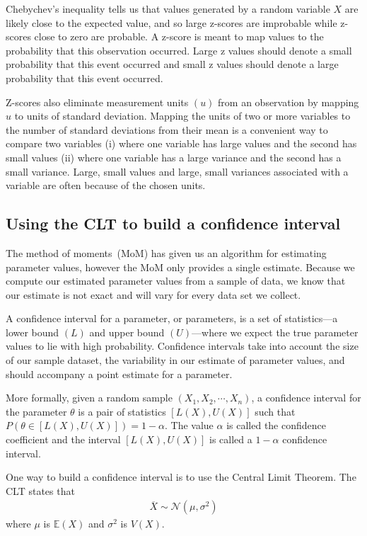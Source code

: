 Chebychev's inequality tells us that values generated by a random variable $X$ are likely close to the expected value, and so large z-scores are improbable while z-scores close to zero are probable.
A z-score is meant to map values to the probability that this observation occurred. Large z values should denote a small probability that this event occurred and small z values should denote a large probability that this event occurred.

Z-scores also eliminate measurement units $(u)$ from an observation by mapping $u$ to units of standard deviation. 
Mapping the units of two or more variables to the number of standard deviations from their mean is a convenient way to compare two variables (i) where one variable has large values and the second has small values (ii) where one variable has a large variance and the second has a small variance. 
Large, small values and large, small variances associated with a variable are often because of the chosen units. 

\subsection{Using the CLT to build a confidence interval}

The method of moments~(MoM) has given us an algorithm for estimating parameter values, however the MoM only provides a single estimate. 
Because we compute our estimated parameter values from a sample of data, we know that our estimate is not exact and will vary for every data set we collect.

A confidence interval for a parameter, or parameters, is a set of statistics---a lower bound $(L)$ and upper bound $(U)$---where we expect the true parameter values to lie with high probability. 
Confidence intervals take into account the size of our sample dataset, the variability in our estimate of parameter values, and should accompany a point estimate for a parameter.

\ex

More formally, given a random sample $(X_{1},X_{2},\cdots,X_{n})$,  a confidence interval for the parameter $\theta$ is a pair of statistics $[L(X), U(X)]$ such that $P(\theta \in [L(X),U(X)]) = 1-\alpha$. 
The value $\alpha$ is called the confidence coefficient and the interval $[L(X), U(X)]$ is called a $1-\alpha$ confidence interval.

One way to build a confidence interval is to use the Central Limit Theorem.
The CLT states that 
\begin{align}
    \overline{X} \sim \mathcal{N}\left( \mu, \sigma^{2} \right)
\end{align}
where $\mu$ is $\mathbb{E}(X)$ and $\sigma^{2}$ is $V(X)$. 

